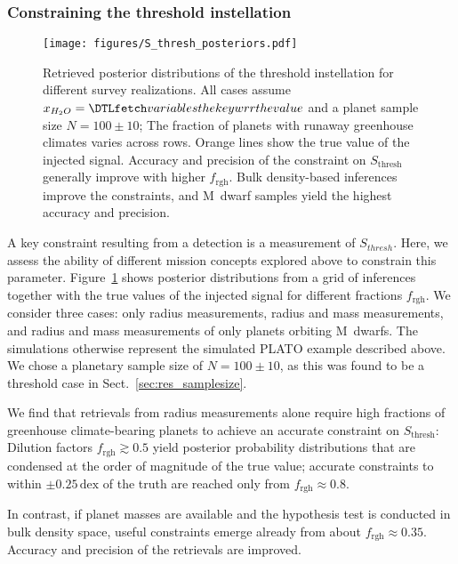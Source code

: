 \documentclass[twocolumn,twocolappendix]{aastex631}
\begin{document}
\subsubsection{Constraining the threshold instellation}\label{sec:res_constrain-S_thresh}
\begin{figure}[ht!]
    \begin{centering}
        \texttt{[image: figures/S\_thresh\_posteriors.pdf]}
        \caption{
            Retrieved posterior distributions of the threshold instellation for different survey realizations.
            All cases assume $x_{H_2O} = \var{wrr}$ and a planet sample size $N=100\pm10$; The fraction of planets with runaway greenhouse climates varies across rows.
            Orange lines show the true value of the injected signal.
            Accuracy and precision of the constraint on $S_\mathrm{thresh}$ generally improve with higher $f_\mathrm{rgh}$.
            Bulk density-based inferences improve the constraints, and M~dwarf samples yield the highest accuracy and precision.
        }
        \label{fig:posterior_surveys}
    \end{centering}
\end{figure}
A key constraint resulting from a detection is a measurement of $S_{thresh}$.
Here, we assess the ability of different mission concepts explored above to constrain this parameter.
Figure~\ref{fig:posterior_surveys} shows posterior distributions from a grid of inferences together with the true values of the injected signal for different fractions $f_\mathrm{rgh}$.
We consider three cases: only radius measurements, radius and mass measurements, and radius and mass measurements of only planets orbiting M~dwarfs.
The simulations otherwise represent the simulated PLATO example described above.
We chose a planetary sample size of $N=100\pm10$, as this was found to be a threshold case in Sect.~\ref{sec:res_samplesize}.

We find that retrievals from radius measurements alone require high fractions of greenhouse climate-bearing planets to achieve an accurate constraint on $S_\mathrm{thresh}$:
Dilution factors $f_\mathrm{rgh} \gtrsim 0.5$ yield posterior probability distributions that are condensed at the order of magnitude of the true value; accurate constraints to within $\pm 0.25\,\mathrm{dex}$ of the truth are reached only from $f_\mathrm{rgh} \approx 0.8$.

In contrast, if planet masses are available and the hypothesis test is conducted in bulk density space, useful constraints emerge already from about $f_\mathrm{rgh} \approx 0.35$.
Accuracy and precision of the retrievals are improved.
\end{document}
